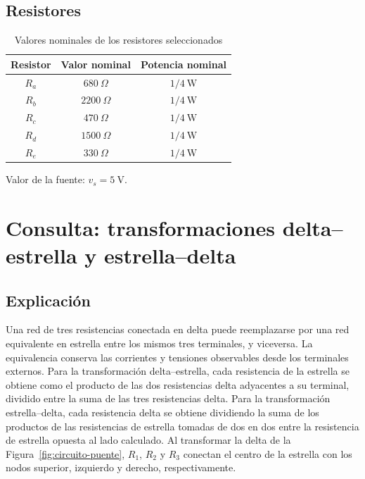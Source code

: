 \documentclass[conference,10pt]{IEEEtran}
\begin{document}
\subsection{Resistores}
\begin{table}[H]
  \caption{Valores nominales de los resistores seleccionados}
  \label{tab:resistores}
  \centering
  \begin{tabular}{ccc}
    \toprule
    Resistor & Valor nominal & Potencia nominal \\
    \midrule
    $R_a$ & $680~\Omega$ & $1/4~\mathrm{W}$ \\
    $R_b$ & $2200~\Omega$ & $1/4~\mathrm{W}$ \\
    $R_c$ & $470~\Omega$ & $1/4~\mathrm{W}$ \\
    $R_d$ & $1500~\Omega$ & $1/4~\mathrm{W}$ \\
    $R_e$ & $330~\Omega$ & $1/4~\mathrm{W}$ \\
    \bottomrule
  \end{tabular}
\end{table}

\noindent Valor de la fuente: $v_s=5~\mathrm{V}$.

\section{Consulta: transformaciones delta--estrella y estrella--delta}
\subsection{Explicación}
Una red de tres resistencias conectada en delta puede reemplazarse por una red equivalente en estrella entre los mismos tres terminales, y viceversa. La equivalencia conserva las corrientes y tensiones observables desde los terminales externos. Para la transformación delta--estrella, cada resistencia de la estrella se obtiene como el producto de las dos resistencias delta adyacentes a su terminal, dividido entre la suma de las tres resistencias delta. Para la transformación estrella--delta, cada resistencia delta se obtiene dividiendo la suma de los productos de las resistencias de estrella tomadas de dos en dos entre la resistencia de estrella opuesta al lado calculado. Al transformar la delta de la Figura~\ref{fig:circuito-puente}, $R_1$, $R_2$ y $R_3$ conectan el centro de la estrella con los nodos superior, izquierdo y derecho, respectivamente.
\end{document}
